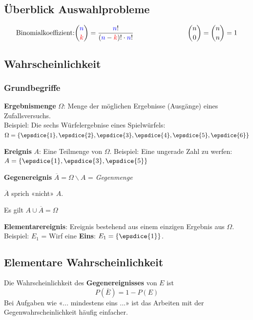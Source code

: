 \subsection*{Überblick Auswahlprobleme}
$$\textrm{Binomialkoeffizient:} {{\color{blue}n}\choose {\color{red}k}} =\frac{{\color{blue}n}!}{({\color{blue}n}-{\color{red}k})!\cdot {\color{blue}n}!}\phantom{etwas Platz lassen} {n\choose 0}= {n\choose n}= 1$$

\hrulefill



\begin{multicols}{2}


\subsection*{Wahrscheinlichkeit}
\subsubsection*{Grundbegriffe}

\textbf{Ergebnismenge} $\Omega$: Menge der möglichen Ergebnisse
(Ausgänge) eines Zufallsversuchs.\\
Beispiel: Die sechs Würfelergebnise
eines Spielwürfels: $\Omega = \left\{\epsdice{1}, \epsdice{2}, \epsdice{3}, \epsdice{4}, \epsdice{5}, \epsdice{6}\right\}$

\textbf{Ereignis} $A$: Eine Teilmenge von $\Omega$. Beispiel: Eine
ungerade Zahl zu werfen: $A  = \left\{\epsdice{1}, \epsdice{3}, \epsdice{5}\right\}$

\textbf{Gegenereignis} $\overline{A} = \Omega \backslash A$ =
\textit{Gegenmenge}

$\overline{A}$ sprich «nicht» $A$.

Es gilt $A \cup \overline{A} = \Omega$

\textbf{Elementarereignis}: Ereignis bestehend aus einem einzigen
Ergebnis aus $\Omega$. Beispiel: $E_1$ = Wirf eine \textbf{Eins}: $E_1
= \left\{\epsdice{1}\right\}$.

\forceCB
\subsection*{Elementare Wahrscheinlichkeit}
Die Wahrscheinlichkeit des \textbf{Gegenereignisses} von $E$ ist
$$P(\overline{E}) = 1- P(E)$$
Bei Aufgaben wie «... mindestens eins ...» ist das Arbeiten mit der
Gegenwahrscheinlichkeit häufig einfacher.


\end{multicols}
